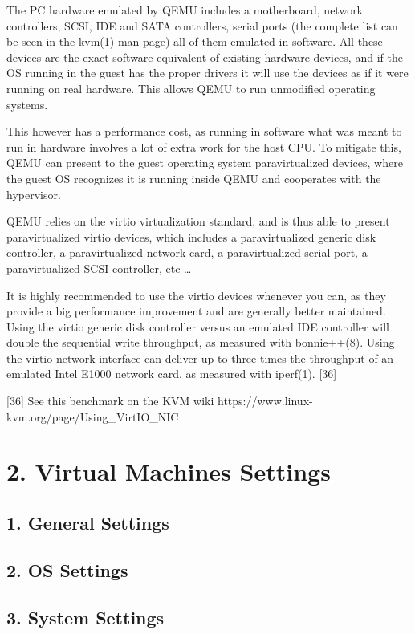 The PC hardware emulated by QEMU includes a motherboard, network controllers, SCSI, IDE and SATA controllers, serial ports (the complete list can be seen in the kvm(1) man page) all of them emulated in software. All these devices are the exact software equivalent of existing hardware devices, and if the OS running in the guest has the proper drivers it will use the devices as if it were running on real hardware. This allows QEMU to run unmodified operating systems.

This however has a performance cost, as running in software what was meant to run in hardware involves a lot of extra work for the host CPU. To mitigate this, QEMU can present to the guest operating system paravirtualized devices, where the guest OS recognizes it is running inside QEMU and cooperates with the hypervisor.

QEMU relies on the virtio virtualization standard, and is thus able to present paravirtualized virtio devices, which includes a paravirtualized generic disk controller, a paravirtualized network card, a paravirtualized serial port, a paravirtualized SCSI controller, etc …

It is highly recommended to use the virtio devices whenever you can, as they provide a big performance improvement and are generally better maintained. Using the virtio generic disk controller versus an emulated IDE controller will double the sequential write throughput, as measured with bonnie++(8). Using the virtio network interface can deliver up to three times the throughput of an emulated Intel E1000 network card, as measured with iperf(1). [36]

[36] See this benchmark on the KVM wiki https://www.linux-kvm.org/page/Using_VirtIO_NIC


\section{2. Virtual Machines Settings}

\subsection{1. General Settings}

\subsection{2. OS Settings}

\subsection{3. System Settings}

